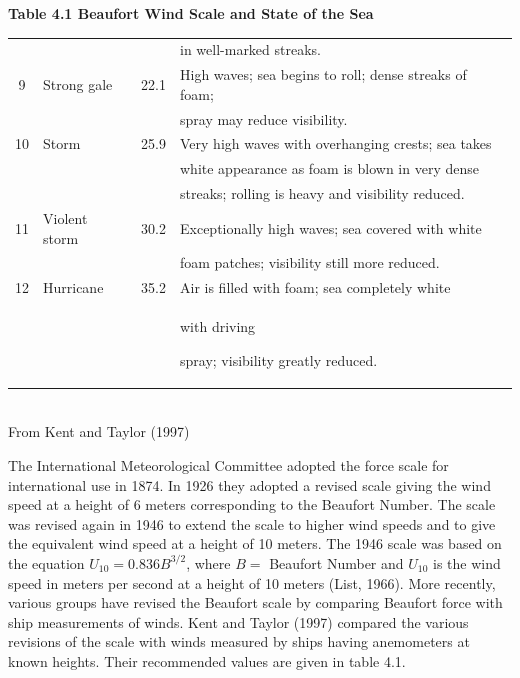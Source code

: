 \begin{table}[t!] {\textbf{\footnotesize{Table 4.1 Beaufort Wind Scale and State of the Sea}}}
\begin{footnotesize}
\begin{tabular}{@{}clrp{70mm}@{}}
\ &\ &\ & \hspace{1em}in well-marked streaks.\\
9 & Strong gale &   22.1  & High waves; sea begins to roll; dense streaks of foam;
\\
\ &\ &\ & \hspace{1em}spray may reduce visibility. \\
10 &    Storm &     25.9  & Very high waves with overhanging crests; sea takes \\
\ &\ &\ & \hspace{1em}white appearance as foam is blown in very dense \\
\ &\ &\ & \hspace{1em}streaks; rolling is heavy and visibility reduced. \\
11 &    Violent storm & 30.2  & Exceptionally high waves; sea covered with white \\
\ &\ &\ & \hspace{1em}foam patches; visibility still more reduced.  \\
12 &    Hurricane & 35.2  & Air is filled with foam; sea completely white\\
\ &\ &\ &  \hspace{1em}with driving  \rule[-2.5ex]{0ex}{0.5ex}spray;
visibility greatly reduced.\\
\hline
\end{tabular} \\[0.5ex]
From Kent and Taylor (1997)
\end{footnotesize}
\vspace{-4ex}
\end{table}

The International Meteorological Committee adopted the force scale for
international use in 1874. In 1926 they adopted a revised scale giving
the wind speed at a height of 6 meters corresponding to the Beaufort
Number. The scale was revised again in 1946 to extend the scale to
higher wind speeds and to give the equivalent wind speed at a height
of 10 meters. The 1946 scale was based on the equation $U_{10} = 0.836
B^{3/2}$, where $B = $ Beaufort Number and $U_{10}$ is the wind speed
in meters per second at a height of 10 meters (List, 1966). More
recently, various groups have revised the Beaufort scale by comparing
Beaufort force with ship measurements of winds. Kent and Taylor (1997)
compared the various revisions of the scale with winds measured by
ships having anemometers at known heights. Their recommended values
are given in table 4.1.


